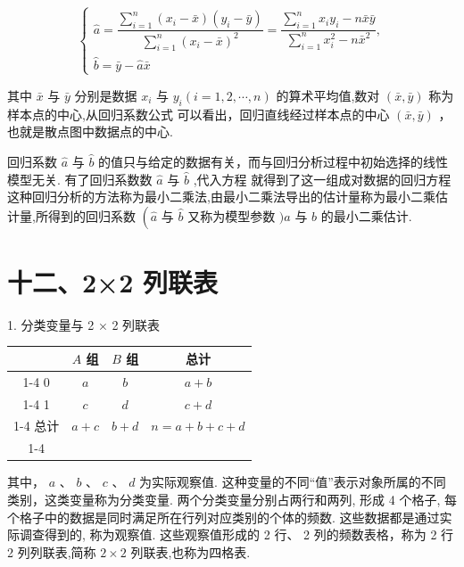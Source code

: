 \[
\left\{  \begin{array}{l} \widehat{a} = \dfrac{\mathop{\sum }\limits_{{i = 1}}^{n}\left( {{x}_{i} - \bar{x}}\right) \left( {{y}_{i} - \bar{y}}\right) }{\mathop{\sum }\limits_{{i = 1}}^{n}{\left( {x}_{i} - \bar{x}\right) }^{2}} = \dfrac{\mathop{\sum }\limits_{{i = 1}}^{n}{x}_{i}{y}_{i} - n\bar{x}\bar{y}}{\mathop{\sum }\limits_{{i = 1}}^{n}{x}_{i}^{2} - n{\bar{x}}^{2}}, \\  \widehat{b} = \bar{y} - \widehat{a}\bar{x} \end{array}\right.
\]

其中 $\bar{x}$ 与 $\bar{y}$ 分别是数据 ${x}_{i}$ 与 ${y}_{i}\left( {i = 1,2,\cdots ,n}\right)$ 的算术平均值,数对 $\left( {\bar{x},\bar{y}}\right)$ 称为样本点的中心,从回归系数公式  可以看出，回归直线经过样本点的中心 $\left( {\bar{x},\bar{y}}\right)$ ，也就是散点图中数据点的中心.

回归系数 $\widehat{a}$ 与 $\widehat{b}$ 的值只与给定的数据有关，而与回归分析过程中初始选择的线性模型无关. 有了回归系数数 $\widehat{a}$ 与 $\widehat{b}$ ,代入方程  就得到了这一组成对数据的回归方程这种回归分析的方法称为最小二乘法,由最小二乘法导出的估计量称为最小二乘估计量,所得到的回归系数 $\left( {\widehat{a}\text{ 与 }\widehat{b}}\right.$ 又称为模型参数 $)a$ 与 $b$ 的最小二乘估计.

\section*{十二、2×2 列联表}

1. 分类变量与 2 × 2 列联表

\begin{center}
\begin{tabular}{|c|c|c|c|}
\hline
\phantom{X} & $A$ 组 & $B$ 组 & 总计 \\
\cline{1-4}
0 & $a$ & $b$ & $a + b$ \\
\cline{1-4}
1 & $c$ & $d$ & $c + d$ \\
\cline{1-4}
总计 & $a + c$ & $b + d$ & $n = a + b + c + d$ \\
\cline{1-4}
\hline
\end{tabular}
\end{center}

其中， $a$ 、 $b$ 、 $c$ 、 $d$ 为实际观察值. 这种变量的不同“值”表示对象所属的不同类别，这类变量称为分类变量. 两个分类变量分别占两行和两列, 形成 4 个格子, 每个格子中的数据是同时满足所在行列对应类别的个体的频数. 这些数据都是通过实际调查得到的, 称为观察值. 这些观察值形成的 2 行、 2 列的频数表格，称为 2 行 2 列列联表,简称 $2 \times  2$ 列联表,也称为四格表.

